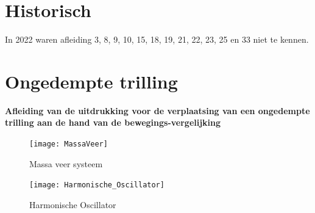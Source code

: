 \documentclass[a4paper,kul]{kulakarticle} %
\begin{document}
\section*{Historisch}
In 2022 waren afleiding 3, 8, 9, 10, 15, 18, 19, 21, 22, 23, 25 en 33 niet te kennen.
\newpage
\section{Ongedempte trilling}

\textbf{Afleiding van de uitdrukking voor de verplaatsing van een ongedempte trilling aan de hand van de bewegings-vergelijking}\\
\begin{figure}[htbp]
	\centering
	\texttt{[image: MassaVeer]}
	\caption[Massa veer systeem]{Massa veer systeem}
	\label{fig:massaveer}
\end{figure}
\begin{figure}[htbp]
	\centering
	\texttt{[image: Harmonische\_Oscillator]}
	\caption[Harmonische Oscillator]{Harmonische Oscillator}
	\label{fig:harmonischeoscilator}%
\end{figure}
\end{document}
